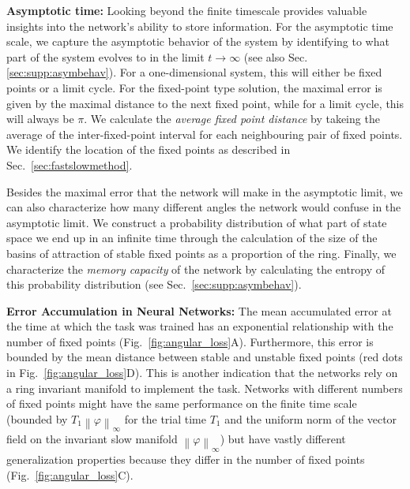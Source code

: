 \documentclass{article} %
\newcommand{\ptitle}[1]{\textbf{#1:}\xspace}
\newcounter{ct}
\newcommand{\uniformNorm}[1]{\left\|#1\right\|_\infty} %
\theoremstyle{definition}
\theoremstyle{remark}
\begin{document}
\ptitle{Asymptotic time}
Looking beyond the finite timescale provides valuable insights into the network's ability to store information.
For the asymptotic time scale, we capture the asymptotic behavior of the system by identifying to what part of the system evolves to in the limit $t\rightarrow\infty$ (see also Sec.\ref{sec:supp:asymbehav}). 
For a one-dimensional system, this will either be fixed points or a limit cycle.
For the fixed-point type solution, the maximal error is given by the maximal distance to the next fixed point, while for a limit cycle, this will always be \(\pi\).
We calculate the \emph{average fixed point distance} by takeing the average of the inter-fixed-point interval for each neighbouring pair of fixed points.
We identify the location of the fixed points as described in Sec.~\ref{sec:fastslowmethod}.

Besides the maximal error that the network will make in the asymptotic limit, we can also characterize how many different angles the network would confuse in the asymptotic limit.
We construct a probability distribution of what part of state space we end up in an infinite time through the calculation of the size of the basins of attraction of stable fixed points as a proportion of the ring.
Finally, we characterize the \emph{memory capacity} of the network by calculating the entropy of this probability distribution (see Sec.~\ref{sec:supp:asymbehav}).


\ptitle{Error Accumulation in Neural Networks}
The mean accumulated error at the time at which the task was trained has an exponential relationship with the number of fixed points (Fig.~\ref{fig:angular_loss}A).
Furthermore, this error is bounded by the mean distance between stable and unstable fixed points (red dots in Fig.~\ref{fig:angular_loss}D).
This is another indication that the networks rely on a ring invariant manifold to implement the task.
Networks with different numbers of fixed points might have the same performance on the finite time scale (bounded by \(T_1\uniformNorm{\varphi}\) for the trial time \(T_1\) and the uniform norm of the vector field on the invariant slow manifold \(\uniformNorm{\varphi}\)) but have vastly different generalization properties because they differ in the number of fixed points (Fig.~\ref{fig:angular_loss}C).
\end{document}
